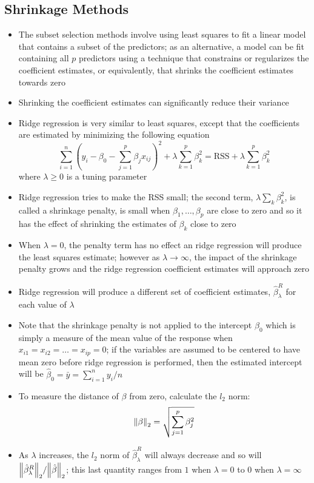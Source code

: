 \documentclass[12pt]{article}
\begin{document}
\subsection{Shrinkage Methods}
\begin{itemize} 
\item The subset selection methods involve using least squares to fit a linear model that contains a subset of the predictors; as an alternative, a model can be fit containing all $p$ predictors using a technique that constrains or regularizes the coefficient estimates, or equivalently, that shrinks the coefficient estimates towards zero
\item Shrinking the coefficient estimates can significantly reduce their variance
\item Ridge regression is very similar to least squares, except that the coefficients are estimated by minimizing the following equation $$ \sum_{i=1}^n \left( y_i - \beta_0 - \sum_{j=1}^p \beta_jx_{ij}\right)^2 + \lambda \sum_{k=1}^p \beta_k^2 = \text{RSS} + \lambda\sum_{k=1}^p \beta_k^2 $$ where $\lambda \geq 0$ is a tuning parameter 
\item Ridge regression tries to make the RSS small; the second term, $\lambda\sum_k \beta_k^2$, is called a shrinkage penalty, is small when $\beta_1,\dots,\beta_p$ are close to zero and so it has the effect of shrinking the estimates of $\beta_k$ close to zero
\item When $\lambda = 0$, the penalty term has no effect an ridge regression will produce the least squares estimate; however as $\lambda \to \infty$, the impact of the shrinkage penalty grows and the ridge regression coefficient estimates will approach zero 
\item Ridge regression will produce a different set of coefficient estimates, $\hat{\beta}_\lambda^R$ for each value of $\lambda$ 
\item Note that the shrinkage penalty is not applied to the intercept $\beta_0$ which is simply a measure of the mean value of the response when $x_{i1} = x_{i2} = \dots = x_{ip} = 0$; if the variables are assumed to be centered to have mean zero before ridge regression is performed, then the estimated intercept will be $\hat{\beta}_0 = \bar{y} = \sum_{i=1}^n y_i / n$ 
\item To measure the distance of $\beta$ from zero, calculate the $l_2$ norm: 
$$ \norm{\beta}_2 = \sqrt{ \sum_{j=1}^p \beta_j^2} $$ 
\item As $\lambda$ increases, the $l_2$ norm of $\hat{\beta}_\lambda^R$ will always decrease and so will $\norm{\hat{\beta}_\lambda^R}_2 / \norm{\hat{\beta}}_2 $; this last quantity ranges from $1$ when $\lambda = 0$ to $0$ when $\lambda=\infty$ 

\end{itemize}
\end{document}
